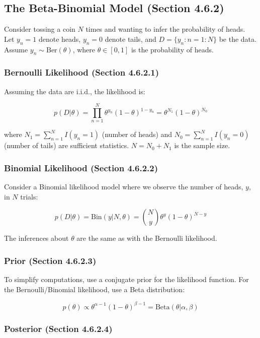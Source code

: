 \documentclass{article}
\begin{document}
\subsection{The Beta-Binomial Model (Section 4.6.2)}

Consider tossing a coin $N$ times and wanting to infer the probability of heads. Let $y_n = 1$ denote heads, $y_n = 0$ denote tails, and $D = \{y_n : n = 1 : N\}$ be the data. Assume $y_n \sim \text{Ber}(\theta)$, where $\theta \in [0, 1]$ is the probability of heads.

\subsubsection{Bernoulli Likelihood (Section 4.6.2.1)}

Assuming the data are i.i.d., the likelihood is:

$$
p(D|\theta) = \prod_{n=1}^{N} \theta^{y_n}(1-\theta)^{1-y_n} = \theta^{N_1}(1-\theta)^{N_0}
$$

where $N_1 = \sum_{n=1}^{N} I(y_n = 1)$ (number of heads) and $N_0 = \sum_{n=1}^{N} I(y_n = 0)$ (number of tails) are sufficient statistics. $N = N_0 + N_1$ is the sample size.

\subsubsection{Binomial Likelihood (Section 4.6.2.2)}

Consider a Binomial likelihood model where we observe the number of heads, $y$, in $N$ trials:

$$
p(D|\theta) = \text{Bin}(y|N, \theta) = \binom{N}{y} \theta^y (1-\theta)^{N-y}
$$

The inferences about $\theta$ are the same as with the Bernoulli likelihood.

\subsubsection{Prior (Section 4.6.2.3)}

To simplify computations, use a conjugate prior for the likelihood function. For the Bernoulli/Binomial likelihood, use a Beta distribution:

$$
p(\theta) \propto \theta^{\alpha-1}(1-\theta)^{\beta-1} = \text{Beta}(\theta|\alpha, \beta)
$$

\subsubsection{Posterior (Section 4.6.2.4)}
\end{document}
